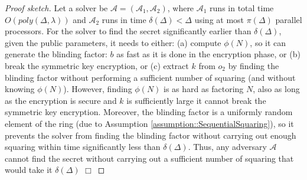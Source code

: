 \begin{proof}[Proof sketch] 
Let  a solver be $\mathcal{A}=(\mathcal{A}_{\scriptscriptstyle 1},\mathcal{A}_{\scriptscriptstyle 2})$, where $\mathcal{A}_{\scriptscriptstyle 1}$ runs in total time $O(poly(\Delta,\lambda))$ and $\mathcal{A}_{\scriptscriptstyle 2}$ runs in  time $\delta(\Delta)<\Delta$ using at most $\pi(\Delta)$ parallel processors. For  the solver to find  the secret significantly earlier than $\delta(\Delta)$, given the public parameters, it needs to either: (a) compute $\phi(N)$, so it can generate the blinding factor: $b$ as fast as it is done in the encryption phase, or (b) break the symmetric key encryption, or (c) extract $k$ from $o_{\scriptscriptstyle 2}$ by finding the blinding factor without performing a sufficient number of  squaring (and without knowing $\phi(N)$). However,  finding  $\phi(N)$ is as hard as factoring $N$, also as long as the encryption is secure and $k$ is sufficiently large  it cannot break the symmetric key encryption. Moreover,  the blinding factor is a uniformly random element of the ring (due to Assumption \ref{assumption::SequentialSquaring}), so it prevents the solver from finding the blinding factor without carrying out enough squaring within time significantly less than $\delta(\Delta)$. Thus, any  adversary $\mathcal{A}$ cannot find the secret without carrying out a sufficient number of squaring that would take it $\delta(\Delta)$ \hfill\(\Box\)
\end{proof}
